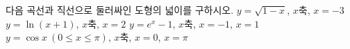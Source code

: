 다음 곡선과 직선으로 둘러싸인 도형의 넓이를 구하시오.
 $y=\sqrt{1-x}$, $x$축, $x=-3$
 $y=\ln (x+1)$, $x$축, $x=2$
 $y=e^x-1$, $x$축, $x=-1$, $x=1$
 $y=\cos x\ (0\le x\le\pi)$, $x$축, $x=0$, $x=\pi$
